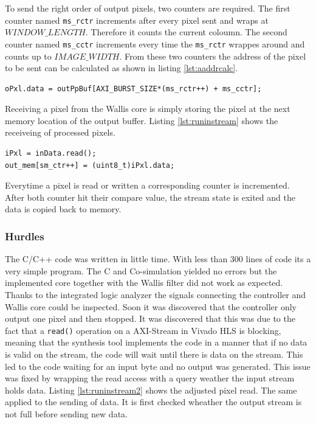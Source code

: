 To send the right order of output pixels, two counters are required. The first
counter named \texttt{ms\_rctr} increments after every pixel sent and wraps at
$WINDOW\_LENGTH$. Therefore it counts the current coloumn. The second counter
named \texttt{ms\_cctr} increments every time the \texttt{ms\_rctr} wrappes
around and counts up to $IMAGE\_WIDTH$. From these two counters the address of
the pixel to be sent can be calculated as shown in listing \ref{lst:aaddrcalc}.

\begin{minipage}{\textwidth}
\begin{lstlisting}[style=CStyle, caption=Pixel send address calculation,
label=lst:aaddrcalc]
oPxl.data = outPpBuf[AXI_BURST_SIZE*(ms_rctr++) + ms_cctr];\end{lstlisting}
\end{minipage}

Receiving a pixel from the Wallis core is simply storing the pixel at the next
memory location of the
output buffer. Listing \ref{lst:runinstream} shows the receiveing of processed
pixels.

\begin{minipage}{\textwidth}
\begin{lstlisting}[style=CStyle, caption=Pixel read store,
label=lst:runinstream]
iPxl = inData.read();
out_mem[sm_ctr++] = (uint8_t)iPxl.data;\end{lstlisting}
\end{minipage}

Everytime a pixel is read or written a corresponding counter is incremented.
After both counter hit their compare value, the stream state is exited and the
data is copied back to memory.

\subsubsection*{Hurdles}
The C/C++ code was written in little time. With less than 300 lines of code its a
very simple program. The C and Co-simulation yielded no errors but the
implemented core together with the Wallis filter did not work as expected.
Thanks to the integrated logic analyzer the signals connecting the controller
and Wallis core could be inspected. Soon it was discovered that the controller
only output one pixel and then stopped. It was discovered that this was due to
the fact that a \texttt{read()} operation on a AXI-Stream in Vivado HLS is
blocking, meaning that the synthesis tool implements the code in a  manner that
if no data is
valid on the stream, the code will wait until there is data on the stream. This
led to the code waiting for an input byte and no output was generated. This
issue was fixed by wrapping the read access with a query weather the input
stream holds data. Listing \ref{lst:runinstream2} shows the adjusted pixel read.
The same applied to the sending of data. It is first checked wheather the output
stream is not full before sending new data.

